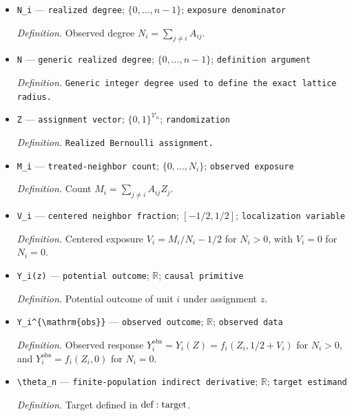 \documentclass{article}
\begin{document}
\begin{itemize}
  \par\smallskip\noindent\emph{Definition.} \texttt{Observed symmetric adjacency matrix with zero diagonal.}
  \item \texttt{N\_\allowbreak{}i} --- \texttt{realized degree}; \(\{0,\ldots,n-1\}\); \texttt{exposure denominator}
  \par\smallskip\noindent\emph{Definition.} Observed degree \(N_i=\sum_{j\ne i}A_{ij}\).
  \item \texttt{N} --- \texttt{generic realized degree}; \(\{0,\ldots,n-1\}\); \texttt{definition argument}
  \par\smallskip\noindent\emph{Definition.} \texttt{Generic integer degree used to define the exact lattice radius.}
  \item \texttt{Z} --- \texttt{assignment vector}; \(\{0,1\}^{\mathcal V_n}\); \texttt{randomization}
  \par\smallskip\noindent\emph{Definition.} \texttt{Realized Bernoulli assignment.}
  \item \texttt{M\_\allowbreak{}i} --- \texttt{treated-\allowbreak{}neighbor count}; \(\{0,\ldots,N_i\}\); \texttt{observed exposure}
  \par\smallskip\noindent\emph{Definition.} Count \(M_i=\sum_{j\ne i}A_{ij}Z_j\).
  \item \texttt{V\_\allowbreak{}i} --- \texttt{centered neighbor fraction}; \([-1/2,1/2]\); \texttt{localization variable}
  \par\smallskip\noindent\emph{Definition.} Centered exposure \(V_i=M_i/N_i-1/2\) for \(N_i>0\), with \(V_i=0\) for \(N_i=0\).
  \item \texttt{Y\_\allowbreak{}i(z)} --- \texttt{potential outcome}; \(\mathbb R\); \texttt{causal primitive}
  \par\smallskip\noindent\emph{Definition.} Potential outcome of unit \(i\) under assignment \(z\).
  \item \texttt{Y\_\allowbreak{}i\textasciicircum{}\{\textbackslash{}\allowbreak{}mathrm\{obs\}\allowbreak{}\}\allowbreak{}} --- \texttt{observed outcome}; \(\mathbb R\); \texttt{observed data}
  \par\smallskip\noindent\emph{Definition.} Observed response \(Y_i^{\mathrm{obs}}=Y_i(Z)=f_i(Z_i,1/2+V_i)\) for \(N_i>0\), and \(Y_i^{\mathrm{obs}}=f_i(Z_i,0)\) for \(N_i=0\).
  \item \texttt{\textbackslash{}\allowbreak{}theta\_\allowbreak{}n} --- \texttt{finite-\allowbreak{}population indirect derivative}; \(\mathbb R\); \texttt{target estimand}
  \par\smallskip\noindent\emph{Definition.} Target defined in \({\rm def:target}\).

\end{itemize}
\end{document}
